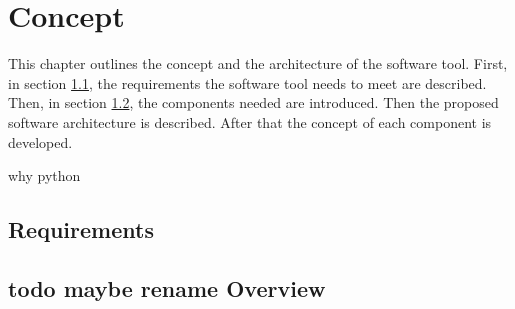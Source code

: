
\chapter{Concept}\label{cha:Concept}
This chapter outlines the concept and the architecture of the software tool.
First, in section \ref{sec:ConceptRequirements}, the requirements the software tool needs to meet are described.
Then, in section \ref{sec:ConceptOverview}, the components needed are introduced.
 Then the proposed software architecture is described. After that the concept of each component is developed.

why python
\section{Requirements}\label{sec:ConceptRequirements}
 
 
\section{todo maybe rename Overview}\label{sec:ConceptOverview}



